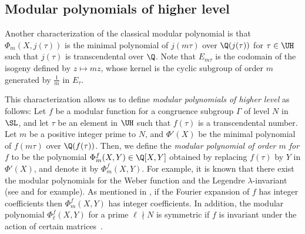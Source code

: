 \documentclass{amsart}
\theoremstyle{definition}
\theoremstyle{remark}
\numberwithin{equation}{section}
\begin{document}
\subsection{Modular polynomials of higher level}
Another characterization of the classical modular polynomial
is that $\Phi_m(X, j(\tau))$ is the minimal polynomial of $j(m\tau)$
over $\Q(j(\tau))$ for $\tau \in \UH$ such that $j(\tau)$ is transcendental over $\Q$.
Note that $E_{m\tau}$ is the codomain of the isogeny defined by
$z \mapsto mz$,
whose kernel is the cyclic subgroup of order $m$ generated by
$\frac{1}{m}$ in $E_\tau$.

This characterization allows us to define \emph{modular polynomials of higher level} as follows:
Let $f$ be a modular function for a congruence subgroup $\Gamma$ of level $N$ in $\SL$,
and let $\tau$ be an element in $\UH$ such that $f(\tau)$ is a transcendental number.
Let $m$ be a positive integer prime to $N$,
and $\Phi'(X)$ be the minimal polynomial of $f(m\tau)$ over $\Q(f(\tau))$.
Then, we define the \emph{modular polynomial of order $m$ for $f$}
to be the polynomial $\Phi_m^f(X, Y) \in \Q[X, Y]$ obtained by
replacing $f(\tau)$ by $Y$ in $\Phi'(X)$,
and denote it by $\Phi_m^f(X, Y)$.
For example,
it is known that there exist the modular polynomials
for the Weber function and the Legendre $\lambda$-invariant
(see \cite{Broker2011,broker2012modular} and \cite[Chap. 4.4]{PiAGM} for example).
As mentioned in \cite{broker2012modular},
if the Fourier expansion of $f$ has integer coefficients
then $\Phi_m^f(X, Y)$ has integer coefficients.
In addition,
the modular polynomial $\Phi_\ell^f(X, Y)$ for a prime $\ell \nmid N$
is symmetric if $f$ is invariant under the action of
certain matrices~\cite[Lemma 5.5]{Broker2011}.
\end{document}
